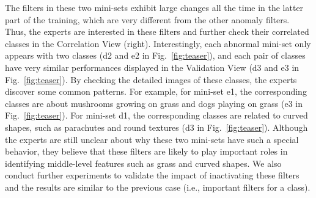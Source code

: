 \documentclass[format=acmsmall, review=false, screen=true]{acmart}
\begin{document}
The filters in these two mini-sets exhibit large changes all the time in the latter part of the training, which are very different from the other anomaly filters.
Thus, the experts are interested in these filters and further check their correlated classes in the Correlation View (right).
Interestingly, each abnormal mini-set only appears with two classes (d2 and e2 in Fig.~\ref{fig:teaser}), and each pair of classes have very similar performances displayed in the Validation View (d3 and e3 in Fig.~\ref{fig:teaser}).
By checking the detailed images of these classes, the experts discover some common patterns.
For example, for mini-set e1, the corresponding classes are about mushrooms growing on grass and dogs playing on grass (e3 in Fig.~\ref{fig:teaser}).
For mini-set d1, the corresponding classes are related to curved shapes, such as parachutes and round textures (d3 in Fig.~\ref{fig:teaser}).
Although the experts are still unclear about why these two mini-sets have such a special behavior, they believe that these filters are likely to play important roles in identifying middle-level features such as grass and curved shapes.
We also conduct further experiments to validate the impact of inactivating these filters and the results are similar to the previous case (i.e., important filters for a class).
\end{document}
